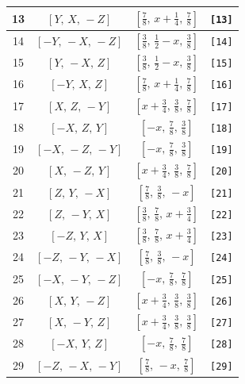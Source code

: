 \documentclass[fleqn,8pt]{jsarticle}
\begin{document}
\begin{longtable}{cccc}
13 & $\left[ Y,\, X,\, - Z \right]$ & $\left[ \frac{7}{8},\, x + \frac{1}{4},\, \frac{7}{8} \right]$ & {\tt [13]} \\ \hline
14 & $\left[ - Y,\, - X,\, - Z \right]$ & $\left[ \frac{3}{8},\, \frac{1}{2} - x,\, \frac{3}{8} \right]$ & {\tt [14]} \\ \hline
15 & $\left[ Y,\, - X,\, Z \right]$ & $\left[ \frac{3}{8},\, \frac{1}{2} - x,\, \frac{3}{8} \right]$ & {\tt [15]} \\ \hline
16 & $\left[ - Y,\, X,\, Z \right]$ & $\left[ \frac{7}{8},\, x + \frac{1}{4},\, \frac{7}{8} \right]$ & {\tt [16]} \\ \hline
17 & $\left[ X,\, Z,\, - Y \right]$ & $\left[ x + \frac{3}{4},\, \frac{3}{8},\, \frac{7}{8} \right]$ & {\tt [17]} \\ \hline
18 & $\left[ - X,\, Z,\, Y \right]$ & $\left[ - x,\, \frac{7}{8},\, \frac{3}{8} \right]$ & {\tt [18]} \\ \hline
19 & $\left[ - X,\, - Z,\, - Y \right]$ & $\left[ - x,\, \frac{7}{8},\, \frac{3}{8} \right]$ & {\tt [19]} \\ \hline
20 & $\left[ X,\, - Z,\, Y \right]$ & $\left[ x + \frac{3}{4},\, \frac{3}{8},\, \frac{7}{8} \right]$ & {\tt [20]} \\ \hline
21 & $\left[ Z,\, Y,\, - X \right]$ & $\left[ \frac{7}{8},\, \frac{3}{8},\, - x \right]$ & {\tt [21]} \\ \hline
22 & $\left[ Z,\, - Y,\, X \right]$ & $\left[ \frac{3}{8},\, \frac{7}{8},\, x + \frac{3}{4} \right]$ & {\tt [22]} \\ \hline
23 & $\left[ - Z,\, Y,\, X \right]$ & $\left[ \frac{3}{8},\, \frac{7}{8},\, x + \frac{3}{4} \right]$ & {\tt [23]} \\ \hline
24 & $\left[ - Z,\, - Y,\, - X \right]$ & $\left[ \frac{7}{8},\, \frac{3}{8},\, - x \right]$ & {\tt [24]} \\ \hline
25 & $\left[ - X,\, - Y,\, - Z \right]$ & $\left[ - x,\, \frac{7}{8},\, \frac{7}{8} \right]$ & {\tt [25]} \\ \hline
26 & $\left[ X,\, Y,\, - Z \right]$ & $\left[ x + \frac{3}{4},\, \frac{3}{8},\, \frac{3}{8} \right]$ & {\tt [26]} \\ \hline
27 & $\left[ X,\, - Y,\, Z \right]$ & $\left[ x + \frac{3}{4},\, \frac{3}{8},\, \frac{3}{8} \right]$ & {\tt [27]} \\ \hline
28 & $\left[ - X,\, Y,\, Z \right]$ & $\left[ - x,\, \frac{7}{8},\, \frac{7}{8} \right]$ & {\tt [28]} \\ \hline
29 & $\left[ - Z,\, - X,\, - Y \right]$ & $\left[ \frac{7}{8},\, - x,\, \frac{7}{8} \right]$ & {\tt [29]} \\ \hline

\end{longtable}
\end{document}

